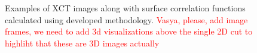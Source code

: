 \documentclass[reprint,amsmath,amssymb,aps,pre,showkeys,showpacs]{revtex4-1}
\begin{document}
\begin{figure}[t]
{    \label{fig:plot-ss-real}}
  \hfill
  \caption[]{Examples of XCT images along with surface correlation functions
    calculated using developed methodology. \textcolor{red}{Vasya, please, add
      image frames, we need to add 3d visualizations above the single 2D cut to
      highliht that these are 3D images actually}}
  \label{fig:real-data-xct}
\end{figure}
\end{document}
